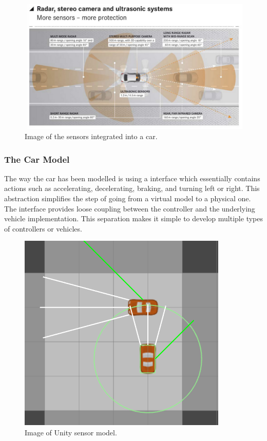 \begin{figure}
\centering
\includegraphics[scale=.2]{img/tesla_sensor}
\caption{Image of the sensors integrated into a car.}
\label{figure:tesla_sens}
\end{figure}

\subsubsection{The Car Model}
The way the car has been modelled is using a interface which essentially contains actions such as accelerating, decelerating, braking, and turning left or right.
This abstraction simplifies the step of going from a virtual model to a physical one.
The interface provides loose coupling between the controller and the underlying vehicle implementation.
This separation makes it simple to develop multiple types of controllers or vehicles.\\

\begin{figure}
\centering
\includegraphics[scale=.5]{img/sensors}
\caption{Image of Unity sensor model.}
\label{figure:unity_sens}
\end{figure}


